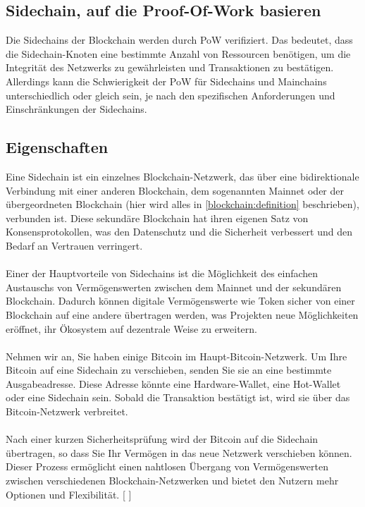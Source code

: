 \documentclass[ngerman]{scrreprt}
\begin{document}
\subsection{Sidechain, auf die Proof-Of-Work basieren}
Die Sidechains der Blockchain werden durch PoW verifiziert. Das bedeutet, dass die Sidechain-Knoten eine bestimmte Anzahl von Ressourcen benötigen, um die Integrität des Netzwerks zu gewährleisten und Transaktionen zu bestätigen. Allerdings kann die Schwierigkeit der PoW für Sidechains und Mainchains unterschiedlich oder gleich sein, je nach den spezifischen Anforderungen und Einschränkungen der Sidechains.
\subsection{Eigenschaften}
Eine Sidechain ist ein einzelnes Blockchain-Netzwerk, das über eine bidirektionale Verbindung mit einer anderen Blockchain, dem sogenannten Mainnet oder der übergeordneten Blockchain (hier wird alles in \cref{blockchain:definition} beschrieben), verbunden ist. Diese sekundäre Blockchain hat ihren eigenen Satz von Konsensprotokollen, was den Datenschutz und die Sicherheit verbessert und den Bedarf an Vertrauen verringert. \\\\
Einer der Hauptvorteile von Sidechains ist die Möglichkeit des einfachen Austauschs von Vermögenswerten zwischen dem Mainnet und der sekundären Blockchain. Dadurch können digitale Vermögenswerte wie Token sicher von einer Blockchain auf eine andere übertragen werden, was Projekten neue Möglichkeiten eröffnet, ihr Ökosystem auf dezentrale Weise zu erweitern. \\ \\
Nehmen wir an, Sie haben einige Bitcoin im Haupt-Bitcoin-Netzwerk. Um Ihre Bitcoin auf eine Sidechain zu verschieben, senden Sie sie an eine bestimmte Ausgabeadresse. Diese Adresse könnte eine Hardware-Wallet, eine Hot-Wallet oder eine Sidechain sein. Sobald die Transaktion bestätigt ist, wird sie über das Bitcoin-Netzwerk verbreitet. \\ \\
Nach einer kurzen Sicherheitsprüfung wird der Bitcoin auf die Sidechain übertragen, so dass Sie Ihr Vermögen in das neue Netzwerk verschieben können. Dieser Prozess ermöglicht einen nahtlosen Übergang von Vermögenswerten zwischen verschiedenen Blockchain-Netzwerken und bietet den Nutzern mehr Optionen und Flexibilität. [ \cite{coin_desk} ] \\ \\
\end{document}
